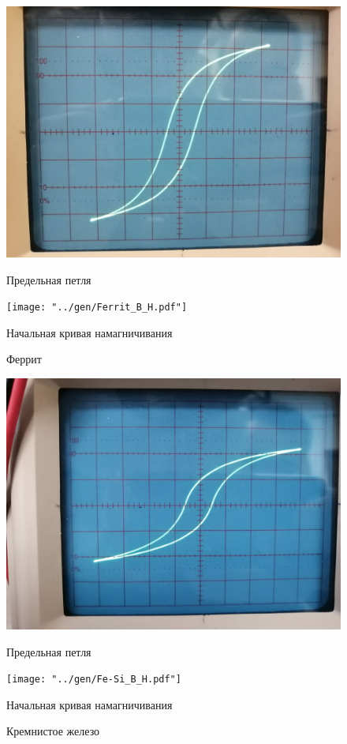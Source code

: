 \begin{figure}[H]
	\centering
	\begin{minipage}[c]{.43\textwidth}
		\centering
		\includegraphics[width=0.9\linewidth]{"../photos/ferrit.jpg"}
		\caption*{Предельная петля}
	\end{minipage}%
	\begin{minipage}[c]{.57\textwidth}
		\centering
		\texttt{[image: "../gen/Ferrit\_B\_H.pdf"]}
		\vspace{-10pt}
		\caption*{Начальная кривая намагничивания}
	\end{minipage}
	\caption{Феррит}
	\label{img:ferrit}
\end{figure}

\begin{figure}[H]
	\centering
	\begin{minipage}[c]{.43\textwidth}
		\centering
		\includegraphics[width=0.9\linewidth]{"../photos/fe_si.jpg"}
		\caption*{Предельная петля}
	\end{minipage}%
	\begin{minipage}[c]{.57\textwidth}
		\centering
		\texttt{[image: "../gen/Fe-Si\_B\_H.pdf"]}
		\vspace{-10pt}
		\caption*{Начальная кривая намагничивания}
	\end{minipage}
	\caption{Кремнистое железо}
	\label{img:fesi}
\end{figure}

